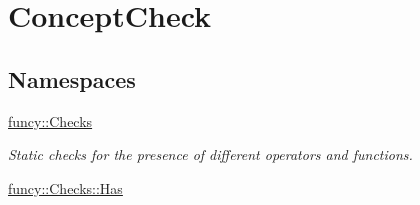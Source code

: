 \hypertarget{group__ConceptCheck}{\section{Concept\-Check}
\label{group__ConceptCheck}
}
\subsection*{Namespaces}
\begin{DoxyCompactItemize}
\item 
\hyperlink{namespacefuncy_1_1Checks}{funcy\-::\-Checks}
\begin{DoxyCompactList}\small\item\em Static checks for the presence of different operators and functions. \end{DoxyCompactList}\item 
\hyperlink{namespacefuncy_1_1Checks_1_1Has}{funcy\-::\-Checks\-::\-Has}
\end{DoxyCompactItemize}

